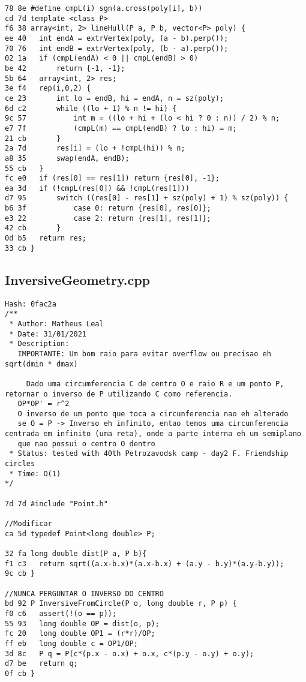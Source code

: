 \documentclass[11pt, a4paper, twoside]{article}
\begin{document}
\begin{lstlisting}
78 8e #define cmpL(i) sgn(a.cross(poly[i], b))
cd 7d template <class P>
f6 38 array<int, 2> lineHull(P a, P b, vector<P> poly) {
ee 40 	int endA = extrVertex(poly, (a - b).perp());
70 76 	int endB = extrVertex(poly, (b - a).perp());
02 1a 	if (cmpL(endA) < 0 || cmpL(endB) > 0)
be 42 		return {-1, -1};
5b 64 	array<int, 2> res;
3e f4 	rep(i,0,2) {
ce 23 		int lo = endB, hi = endA, n = sz(poly);
6d c2 		while ((lo + 1) % n != hi) {
9c 57 			int m = ((lo + hi + (lo < hi ? 0 : n)) / 2) % n;
e7 7f 			(cmpL(m) == cmpL(endB) ? lo : hi) = m;
21 cb 		}
2a 7d 		res[i] = (lo + !cmpL(hi)) % n;
a8 35 		swap(endA, endB);
55 cb 	}
fc e0 	if (res[0] == res[1]) return {res[0], -1};
ea 3d 	if (!cmpL(res[0]) && !cmpL(res[1]))
d7 95 		switch ((res[0] - res[1] + sz(poly) + 1) % sz(poly)) {
b6 3f 			case 0: return {res[0], res[0]};
e3 22 			case 2: return {res[1], res[1]};
42 cb 		}
0d b5 	return res;
33 cb }
\end{lstlisting}

\subsection{InversiveGeometry.cpp}
\begin{lstlisting}
Hash: 0fac2a
/**
 * Author: Matheus Leal
 * Date: 31/01/2021
 * Description:
   IMPORTANTE: Um bom raio para evitar overflow ou precisao eh sqrt(dmin * dmax)
   
	 Dado uma circumferencia C de centro O e raio R e um ponto P, retornar o inverso de P utilizando C como referencia.
   OP*OP' = r^2
   O inverso de um ponto que toca a circunferencia nao eh alterado
   se O = P -> Inverso eh infinito, entao temos uma circunferencia centrada em infinito (uma reta), onde a parte interna eh um semiplano
   que nao possui o centro O dentro
 * Status: tested with 40th Petrozavodsk camp - day2 F. Friendship circles
 * Time: O(1)
*/

7d 7d #include "Point.h"

//Modificar
ca 5d typedef Point<long double> P;

32 fa long double dist(P a, P b){
f1 c3 	return sqrt((a.x-b.x)*(a.x-b.x) + (a.y - b.y)*(a.y-b.y));
9c cb }

//NUNCA PERGUNTAR O INVERSO DO CENTRO
bd 92 P InversiveFromCircle(P o, long double r, P p) {
f0 c6 	assert(!(o == p));
55 93 	long double OP = dist(o, p);
fc 20 	long double OP1 = (r*r)/OP;
ff eb 	long double c = OP1/OP;
3d 8c 	P q = P(c*(p.x - o.x) + o.x, c*(p.y - o.y) + o.y);
d7 be 	return q; 
0f cb }
\end{lstlisting}
\end{document}

